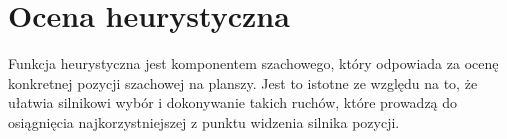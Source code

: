 \section{Ocena heurystyczna}
\label{sec:ocena-heurystyczna}

Funkcja heurystyczna jest komponentem szachowego, który odpowiada za ocenę konkretnej pozycji szachowej na planszy.
Jest to istotne ze względu na to, że ułatwia silnikowi wybór i dokonywanie takich ruchów, które prowadzą do osiągnięcia najkorzystniejszej z punktu widzenia silnika pozycji.